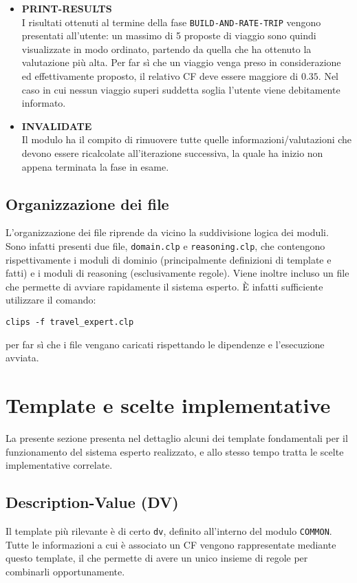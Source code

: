 \begin{itemize}
\item \textbf{PRINT-RESULTS}\\
I risultati ottenuti al termine della fase \texttt{BUILD-AND-RATE-TRIP} vengono presentati all'utente: un massimo di 5 proposte di viaggio sono quindi visualizzate in modo ordinato, partendo da quella che ha ottenuto la valutazione più alta. Per far sì che un viaggio venga preso in considerazione ed effettivamente proposto, il relativo CF deve essere maggiore di $0.35$. Nel caso in cui nessun viaggio superi suddetta soglia l'utente viene debitamente informato.
\item \textbf{INVALIDATE}\\
Il modulo ha il compito di rimuovere tutte quelle informazioni/valutazioni che devono essere ricalcolate all'iterazione successiva, la quale ha inizio non appena terminata la fase in esame.
\end{itemize}

\subsection{Organizzazione dei file}
L'organizzazione dei file riprende da vicino la suddivisione logica dei moduli. Sono infatti presenti due file, \texttt{domain.clp} e \texttt{reasoning.clp}, che contengono rispettivamente i moduli di dominio (principalmente definizioni di template e fatti) e i moduli di reasoning (esclusivamente regole).
Viene inoltre incluso un file che permette di avviare rapidamente il sistema esperto. È infatti sufficiente utilizzare il comando:
\begin{center}
\texttt{clips -f travel\_expert.clp}
\end{center}
per far sì che i file vengano caricati rispettando le dipendenze e l'esecuzione avviata.

\section{Template e scelte implementative}

La presente sezione presenta nel dettaglio alcuni dei template fondamentali per il funzionamento del sistema esperto realizzato, e allo stesso tempo tratta le scelte implementative correlate.

\subsection{Description-Value (DV)}

Il template più rilevante è di certo \texttt{dv}, definito all'interno del modulo \texttt{COMMON}. Tutte le informazioni a cui è associato un CF vengono rappresentate mediante questo template, il che permette di avere un unico insieme di regole per combinarli opportunamente.

